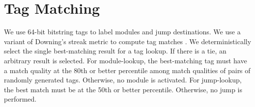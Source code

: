 \section{Tag Matching}

We use 64-bit bitstring tags to label modules and jump destinations.
We use a variant of Downing's streak metric to compute tag matches \citep{downing2015intelligence,moreno2023matchmaker}.
We deterministically select the single best-matching result for a tag lookup.
If there is a tie, an arbitrary result is selected.
For module-lookup, the best-matching tag must have a match quality at the 80th or better percentile among match qualities of pairs of randomly generated tags.
Otherwise, no module is activated.
For jump-lookup, the best match must be at the 50th or better percentile.
Otherwise, no jump is performed.
